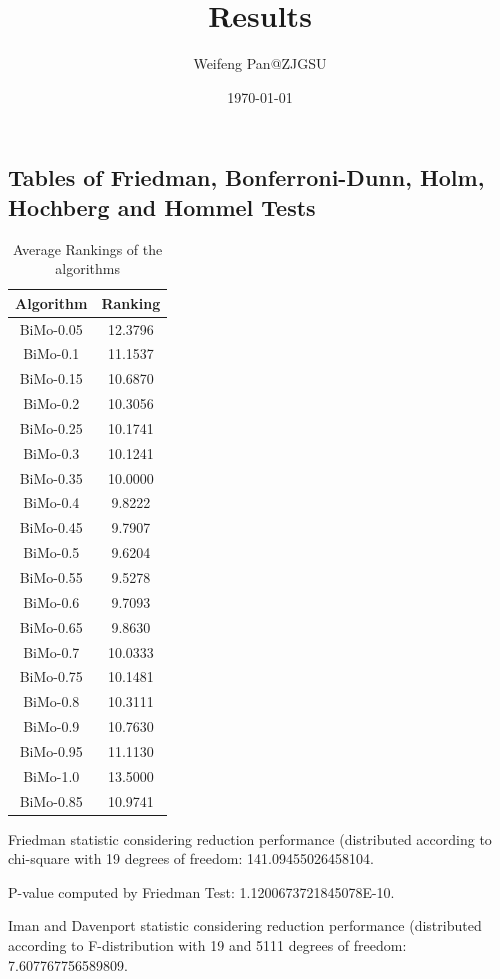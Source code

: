 \documentclass[a4paper,10pt]{article}
\title{Results}
\author{Weifeng Pan@ZJGSU}
\date{\today}
\begin{document}
\begin{landscape}
\oddsidemargin 0in \topmargin 0in\maketitle
\section{Tables of Friedman, Bonferroni-Dunn, Holm, Hochberg and Hommel Tests}
\begin{table}[!htp]
\centering
\caption{Average Rankings of the algorithms
}\begin{tabular}{c|c}
Algorithm&Ranking\\
\hline
BiMo-0.05&12.3796\\
BiMo-0.1&11.1537\\
BiMo-0.15&10.6870\\
BiMo-0.2&10.3056\\
BiMo-0.25&10.1741\\
BiMo-0.3&10.1241\\
BiMo-0.35&10.0000\\
BiMo-0.4&9.8222\\
BiMo-0.45&9.7907\\
BiMo-0.5&9.6204\\
BiMo-0.55&9.5278\\
BiMo-0.6&9.7093\\
BiMo-0.65&9.8630\\
BiMo-0.7&10.0333\\
BiMo-0.75&10.1481\\
BiMo-0.8&10.3111\\
BiMo-0.9&10.7630\\
BiMo-0.95&11.1130\\
BiMo-1.0&13.5000\\
BiMo-0.85&10.9741\\
\end{tabular}
\end{table}


Friedman statistic considering reduction performance (distributed according to chi-square with 19 degrees of freedom: 141.09455026458104.


P-value computed by Friedman Test: 1.1200673721845078E-10.\newline

Iman and Davenport statistic considering reduction performance (distributed according to F-distribution with 19 and 5111 degrees of freedom: 7.607767756589809.



\end{landscape}
\end{document}
